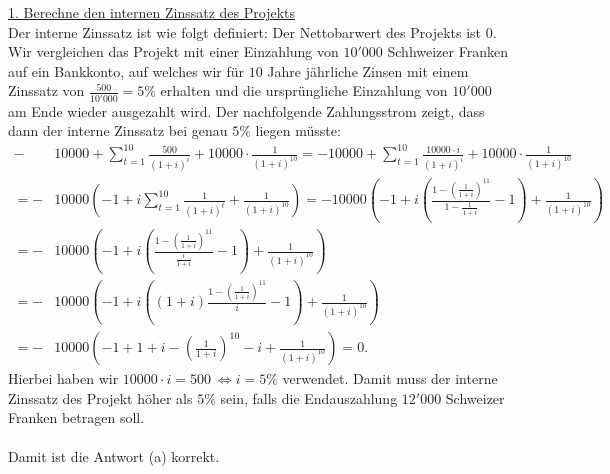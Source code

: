 \underline{1. Berechne den internen Zinssatz des Projekts}\\
Der interne Zinssatz ist wie folgt definiert: Der Nettobarwert des Projekts ist $0$.\\
Wir vergleichen das Projekt mit einer Einzahlung von $10'000$ Schhweizer Franken auf ein Bankkonto, auf welches wir für $10 $ Jahre jährliche Zinsen mit einem Zinssatz von $\frac{500}{10'000} = 5 \%$ erhalten und die ursprüngliche Einzahlung  von $10'000$ am Ende wieder ausgezahlt wird. Der nachfolgende Zahlungsstrom zeigt, dass dann der interne Zinssatz bei genau $5 \%$ liegen müsste: 
\begin{align*}
	-&10000 + \sum \limits_{t = 1}^{10} \frac{500}{(1+i)^i} + 10000 \cdot \frac{1}{(1+i)^{10}}
	=
	-10000 + \sum \limits_{t = 1}^{10} \frac{10000 \cdot i}{(1+i)^i} + 10000 \cdot \frac{1}{(1+i)^{10}}\\
	=
	-&10000 \left(-1 + i \sum \limits_{t = 1}^{10 }\frac{1}{(1+i)^t} + \frac{1}{(1+i)^{10}} \right) 
	=
	-10000 \left(-1 + i \left(\frac{1 - \left(\frac{1}{1+i}\right)^{11} }{1 - \frac{1}{1+i}} -1 \right)+ \frac{1}{(1+i)^{10}} \right)\\
	=
	-&10000 \left(-1 + i \left(\frac{1 - \left(\frac{1}{1+i}\right)^{11} }{ \frac{i}{1+i}}  -1 \right)+ \frac{1}{(1+i)^{10}} \right)\\
	=
	-&10000 \left(-1 + i \left( (1+i)\frac{1 - \left(\frac{1}{1+i}\right)^{11} }{ i} -1 \right)+ \frac{1}{(1+i)^{10}} \right )\\
	=
	-&10000 \left(-1 +  1+i  - \left(\frac{1}{1+i}\right)^{10}  -i + \frac{1}{(1+i)^{10}} \right )
	= 0.
\end{align*}
Hierbei haben wir $10000 \cdot i = 500  \ \Leftrightarrow i = 5\%$ verwendet. 
Damit muss der interne Zinssatz des Projekt höher als $5 \% $ sein, falls die Endauszahlung $12'000$ Schweizer Franken betragen soll.\\
\\
Damit ist die Antwort (a) korrekt.


 \newpage


